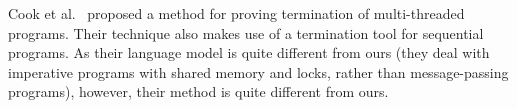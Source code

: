 Cook et al.~\cite{Cook07PLDI} proposed a method for proving
termination of multi-threaded programs. Their technique also makes use
of a termination tool for sequential programs.  As their language
model is quite different from ours (they deal with imperative programs
with shared memory and locks, rather than message-passing programs),
however, their method is quite different from ours.



